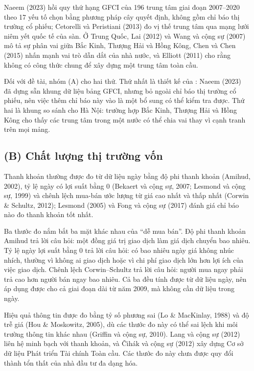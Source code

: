 Naeem (2023) hồi quy thứ hạng GFCI của 196 trung tâm giai đoạn 2007--2020 theo 17 yếu tố chọn bằng phương pháp cây quyết định, không gồm chỉ báo thị trường cổ phiếu; Cetorelli và Peristiani (2013) đo vị thế trung tâm qua mạng lưới niêm yết quốc tế của sàn. Ở Trung Quốc, Lai (2012) và Wang và cộng sự (2007) mô tả sự phân vai giữa Bắc Kinh, Thượng Hải và Hồng Kông, Chen và Chen (2015) nhấn mạnh vai trò dẫn dắt của nhà nước, và Elliott (2011) cho rằng không có công thức chung để xây dựng một trung tâm toàn cầu.

Đối với đề tài, nhóm (A) cho hai thứ. Thứ nhất là thiết kế của : Naeem (2023) đã dựng sẵn khung dữ liệu bảng GFCI, nhưng bỏ ngoài chỉ báo thị trường cổ phiếu, nên việc thêm chỉ báo này vào là một bổ sung có thể kiểm tra được. Thứ hai là khung so sánh cho Hà Nội: trường hợp Bắc Kinh, Thượng Hải và Hồng Kông cho thấy các trung tâm trong một nước có thể chia vai thay vì cạnh tranh trên mọi mảng.

\subsection*{(B) Chất lượng thị trường vốn}

Thanh khoản thường được đo từ dữ liệu ngày bằng độ phi thanh khoản (Amihud, 2002), tỷ lệ ngày có lợi suất bằng 0 (Bekaert và cộng sự, 2007; Lesmond và cộng sự, 1999) và chênh lệch mua-bán ước lượng từ giá cao nhất và thấp nhất (Corwin \& Schultz, 2012); Lesmond (2005) và Fong và cộng sự (2017) đánh giá chỉ báo nào đo thanh khoản tốt nhất.

Ba thước đo nắm bắt ba mặt khác nhau của \enquote{dễ mua bán}. Độ phi thanh khoản Amihud trả lời câu hỏi: một đồng giá trị giao dịch làm giá dịch chuyển bao nhiêu. Tỷ lệ ngày lợi suất bằng 0 trả lời câu hỏi: có bao nhiêu ngày giá không nhúc nhích, thường vì không ai giao dịch hoặc vì chi phí giao dịch lớn hơn lợi ích của việc giao dịch. Chênh lệch Corwin--Schultz trả lời câu hỏi: người mua ngay phải trả cao hơn người bán ngay bao nhiêu. Cả ba đều tính được từ dữ liệu ngày, nên áp dụng được cho cả giai đoạn dài từ năm 2009, mà không cần dữ liệu trong ngày.

Hiệu quả thông tin được đo bằng tỷ số phương sai (Lo \& MacKinlay, 1988) và độ trễ giá (Hou \& Moskowitz, 2005), dù các thước đo này có thể sai lệch khi môi trường thông tin khác nhau (Griffin và cộng sự, 2010). Lang và cộng sự (2012) liên hệ minh bạch với thanh khoản, và Čihák và cộng sự (2012) xây dựng Cơ sở dữ liệu Phát triển Tài chính Toàn cầu. Các thước đo này chưa được quy đổi thành tổn thất của nhà đầu tư đa dạng hóa.

